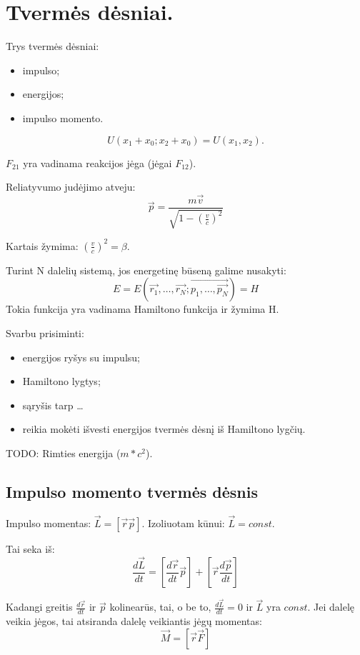 \section{Tvermės dėsniai.}

Trys tvermės dėsniai:
\begin{itemize}
  \item impulso;
  \item energijos;
  \item impulso momento.
\end{itemize}

\begin{equation*}
  U(x_{1} + x_{0}; x_{2}+x_{0}) = U(x_{1},x_{2}).
\end{equation*}

$F_{21}$ yra vadinama reakcijos jėga (jėgai $F_{12}$).

Reliatyvumo judėjimo atveju:
\begin{equation*}
  \vec{p} = \frac{m\vec{v}}{\sqrt{1 - (\frac{v}{c})^{2}}}
\end{equation*}

\begin{note}
  Kartais žymima: $\left( \frac{v}{c} \right)^{2} = \beta$.
\end{note}

Turint N dalelių sistemą, jos energetinę būseną galime nusakyti:
\begin{equation*}
  E = E(\vec{r_{1}},\ldots,\vec{r_{N}}; \vec{p_{1},\ldots,\vec{p_{N}}}) = H
\end{equation*}
Tokia funkcija yra vadinama Hamiltono funkcija ir žymima H.

Svarbu prisiminti:
\begin{itemize}
  \item energijos ryšys su impulsu;
  \item Hamiltono lygtys;
  \item sąryšis tarp …
  \item reikia mokėti išvesti energijos tvermės dėsnį iš Hamiltono
    lygčių.
\end{itemize}

TODO: Rimties energija ($m*c^{2}$).

\subsection{Impulso momento tvermės dėsnis}

Impulso momentas: $\vec{L} = \left[ \vec{r}\vec{p} \right]$.
Izoliuotam kūnui: $\vec{L} = const.$

Tai seka iš:
\begin{equation*}
  \frac{d\vec{L}}{dt} = \left[ \frac{d\vec{r}}{dt} \vec{p} \right] +
  \left[ \vec{r} \frac{d\vec{p}}{dt} \right]
\end{equation*}

Kadangi greitis $\frac{d\vec{r}}{dt}$ ir $\vec{p}$ kolinearūs, tai,
o be to, $\frac{d\vec{L}}{dt} = 0$ ir $\vec{L}$ yra $const$.
Jei dalelę veikia jėgos, tai atsiranda dalelę veikiantis jėgų
momentas:
\begin{equation*}
  \vec{M} = \left[ \vec{r}\vec{F} \right]
\end{equation*}
